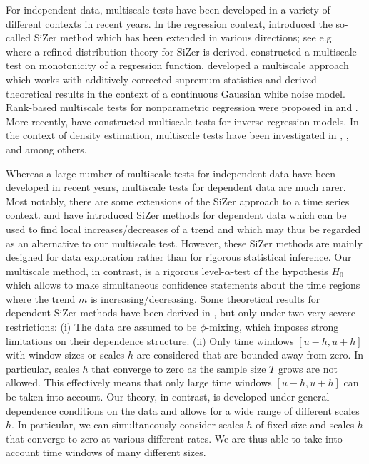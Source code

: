 For independent data, multiscale tests have been developed in a variety of different contexts in recent years. In the regression context, \cite{ChaudhuriMarron1999,ChaudhuriMarron2000} introduced the so-called SiZer method which has been extended in various directions; see e.g.\ \cite{HannigMarron2006} where a refined distribution theory for SiZer is derived. \cite{HallHeckman2000} constructed a multiscale test on monotonicity of a regression function. \cite{DuembgenSpokoiny2001} developed a multiscale approach which works with additively corrected supremum statistics and derived theoretical results in the context of a continuous Gaussian white noise model. Rank-based multiscale tests for nonparametric regression were proposed in \cite{Duembgen2002} and \cite{Rohde2008}. More recently, \cite{ProkschWernerMunk2018} have constructed multiscale tests for inverse regression models. In the context of density estimation, multiscale tests have been investigated in \cite{DuembgenWalther2008}, \cite{RufibachWalther2010}, \cite{SchmidtHieber2013} and \cite{EckleBissantzDette2017} among others. 


Whereas a large number of multiscale tests for independent data have been developed in recent years, multiscale tests for dependent data are much rarer. Most notably, there are some extensions of the SiZer approach to a time series context. \cite{Rondonotti2004} and \cite{Rondonotti2007} have introduced SiZer methods for dependent data which can be used to find local increases/decreases of a trend and which may thus be regarded as an alternative to our multiscale test. However, these SiZer methods are mainly designed for data exploration rather than for rigorous statistical inference. Our multiscale method, in contrast, is a rigorous level-$\alpha$-test of the hypo\-thesis $H_0$ which allows to make simultaneous confidence statements about the time regions where the trend $m$ is increasing/decreasing. Some theoretical results for dependent SiZer methods have been derived in \cite{ParkHannigKang2009}, but only under two very severe restrictions: (i) The data are assumed to be $\phi$-mixing, which imposes strong limitations on their dependence structure. (ii) Only time windows $[u-h,u+h]$ with window sizes or scales $h$ are considered that are bounded away from zero. In particular, scales $h$ that converge to zero as the sample size $T$ grows are not allowed. This effectively means that only large time windows $[u-h,u+h]$ can be taken into account. Our theory, in contrast, is developed under general dependence conditions on the data and allows for a wide range of different scales $h$. In particular, we can simultaneously consider scales $h$ of fixed size and scales $h$ that converge to zero at various different rates. We are thus able to take into account time windows of many different sizes. 


